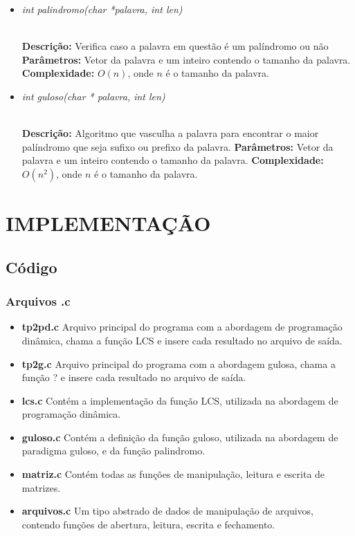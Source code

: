 \documentclass[12pt]{article}
\begin{document}
\begin{itemize}
 \item \begin{large}\textit{int palindromo(char *palavra, int len)}\end{large}\\
 \subitem \textbf{Descrição:} Verifica caso a palavra em questão é um palíndromo ou não
 \subitem \textbf{Parâmetros:} Vetor da palavra e um inteiro contendo o tamanho da palavra.
 \subitem \textbf{Complexidade:} $O(n)$, onde $n$ é o tamanho da palavra.
\end{itemize}

\vspace{0.2 true cm}

\begin{itemize}
 \item \begin{large}\textit{int guloso(char * palavra, int len)}\end{large}\\
 \subitem \textbf{Descrição:} Algoritmo que vasculha a palavra para encontrar o maior palíndromo que seja sufixo ou prefixo da palavra.
 \subitem \textbf{Parâmetros:} Vetor da palavra e um inteiro contendo o tamanho da palavra.
 \subitem \textbf{Complexidade:} $O(n^2)$, onde $n$ é o tamanho da palavra.
\end{itemize}

\vspace{0.2 true cm}


\section{IMPLEMENTAÇÃO}
\label{implementacao}

\subsection{Código}

\subsubsection{Arquivos .c}

\begin{itemize}
\item \textbf{tp2pd.c} Arquivo principal do programa com a abordagem de programação dinâmica, chama a função LCS e insere cada resultado no arquivo de saída.
\item \textbf{tp2g.c} Arquivo principal do programa com a abordagem gulosa, chama a função ? e insere cada resultado no arquivo de saída.
\item \textbf{lcs.c} Contém a implementação da função LCS, utilizada na abordagem de programação dinâmica.
\item \textbf{guloso.c} Contém a definição da função guloso, utilizada na abordagem de paradigma guloso, e da função palindromo.
\item \textbf{matriz.c} Contém todas as funções de manipulação, leitura e escrita de matrizes.
\item \textbf{arquivos.c} Um tipo abstrado de dados de manipulação de arquivos, contendo funções de abertura, leitura, escrita e fechamento.
\end{itemize}
\end{document}
